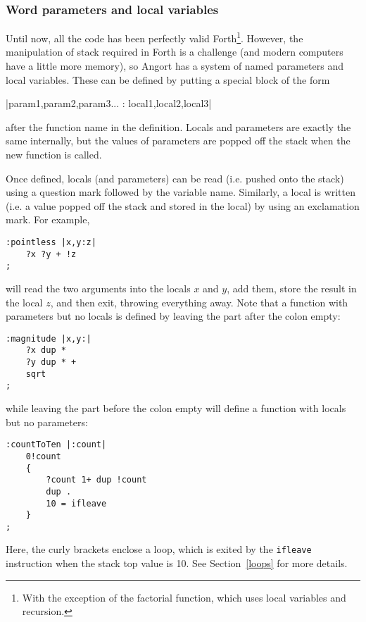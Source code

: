 \subsubsection{Word parameters and local variables}
Until now, all the code has been perfectly valid Forth\footnote{With
the exception of the factorial function, which uses local variables
and recursion.}. However, the manipulation of
stack required in Forth is a challenge (and modern computers
have a little more memory), so Angort has a system of named
parameters and local variables. These can be defined by
putting a special block of the form
\begin{v}
|param1,param2,param3... : local1,local2,local3|
\end{v}
after the function name in the definition. Locals and parameters are
exactly the same internally, but the values of parameters are popped
off the stack when the new function is called. 


Once defined, locals (and parameters) can be read (i.e. pushed onto
the stack) using a question mark followed by the variable name.
Similarly, a local is written (i.e. a value popped off the stack and
stored in the local) by using an exclamation mark. For example,
\begin{lstlisting}
:pointless |x,y:z|
    ?x ?y + !z
;
\end{lstlisting}
will read the two arguments into the locals $x$ and $y$, add them,
store the result in the local $z$, and then exit, throwing everything away.
Note that a function with parameters but no locals is defined by leaving
the part after the colon empty:
\begin{lstlisting}
:magnitude |x,y:|
    ?x dup *
    ?y dup * +
    sqrt
;
\end{lstlisting}
while leaving the part before the colon empty will define a function with
locals but no parameters:
\begin{lstlisting}
:countToTen |:count|
    0!count
    {
        ?count 1+ dup !count
        dup .
        10 = ifleave
    }
;
\end{lstlisting}
Here, the curly brackets enclose a loop, which is exited by the
\texttt{ifleave} instruction when the stack top value is 10. See
Section~\ref{loops} for more details.
     
